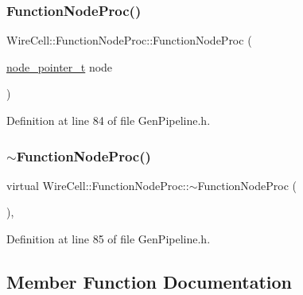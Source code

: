 \subsubsection{\texorpdfstring{Function\+Node\+Proc()}{FunctionNodeProc()}}
{\footnotesize\ttfamily Wire\+Cell\+::\+Function\+Node\+Proc\+::\+Function\+Node\+Proc (\begin{DoxyParamCaption}\item[{\hyperlink{class_wire_cell_1_1_function_node_proc_aae8c47d99f259cf8133ef2c071616d41}{node\+\_\+pointer\+\_\+t}}]{node }\end{DoxyParamCaption})\hspace{0.3cm}{\ttfamily [inline]}}



Definition at line 84 of file Gen\+Pipeline.\+h.

\mbox{\label{class_wire_cell_1_1_function_node_proc_a10ab7abef41515b35da3175d5c5844d9}} 
\subsubsection{\texorpdfstring{$\sim$\+Function\+Node\+Proc()}{~FunctionNodeProc()}}
{\footnotesize\ttfamily virtual Wire\+Cell\+::\+Function\+Node\+Proc\+::$\sim$\+Function\+Node\+Proc (\begin{DoxyParamCaption}{ }\end{DoxyParamCaption})\hspace{0.3cm}{\ttfamily [inline]}, {\ttfamily [virtual]}}



Definition at line 85 of file Gen\+Pipeline.\+h.



\subsection{Member Function Documentation}
\mbox{\label{class_wire_cell_1_1_function_node_proc_a848ef80dad2daa18d3c6ff85ab0db9e4}} 
